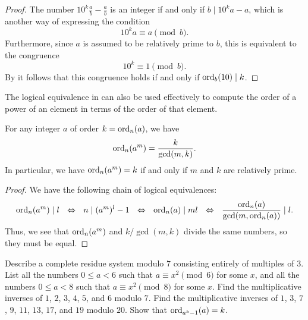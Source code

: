 \begin{proof}
  The number $10^k\frac{a}{b}-\frac{a}{b}$ is an integer if and only if $b\mid 10^ka-a$, which is another way of expressing the condition
  \begin{equation*}
    10^ka \equiv a \pmod{b}.
  \end{equation*}
  Furthermore, since $a$ is assumed to be relatively prime to $b$, this is equivalent to the congruence
  \begin{equation*}
    10^k \equiv 1 \pmod{b}.
  \end{equation*}
  By  it follows that this congruence holds if and only if $\operatorname{ord}_b(10)\mid k$.
\end{proof}

The logical equivalence in  can also be used effectively to compute the order of a power of an element in terms of the order of that element.

\begin{theorem}\label{theorem:order-power}
  For any integer $a$ of order $k=\operatorname{ord}_n(a)$, we have
  \begin{equation*}
    \operatorname{ord}_n(a^m)=\frac{k}{\gcd(m,k)}.
  \end{equation*}
  In particular, we have $\operatorname{ord}_n(a^m)=k$ if and only if $m$ and $k$ are relatively prime.
\end{theorem}

\begin{proof}
  We have the following chain of logical equivalences:
  \begin{equation*}
    \operatorname{ord}_n(a^m) \mid l ~~\Leftrightarrow~~ n \mid (a^m)^l-1
    ~~\Leftrightarrow~~ \operatorname{ord}_n(a) \mid ml
    ~~\Leftrightarrow~~ \frac{\operatorname{ord}_n(a)}{\gcd(m,\operatorname{ord}_n(a))} \mid l.
  \end{equation*}
  Thus, we see that $\operatorname{ord}_n(a^m)$ and $k/\gcd(m,k)$ divide the same numbers, so they must be equal.
\end{proof}

\exercises

\begin{starter}
  \exercise Describe a complete residue system modulo $7$ consisting entirely of multiples of $3$.
  \exercise List all the numbers $0\leq a<6$ such that $a\equiv x^2\pmod 6$ for some $x$, and all the numbers $0\leq a<8$ such that $a\equiv x^2\pmod 8$ for some $x$.
  \exercise Find the multiplicative inverses of $1$, $2$, $3$, $4$, $5$, and $6$ modulo $7$.
  \exercise Find the multiplicative inverses of $1$, $3$, $7$, $9$, $11$, $13$, $17$, and $19$ modulo $20$.
  \exercise Show that $\operatorname{ord}_{a^k-1}(a)=k$.
\end{starter}

